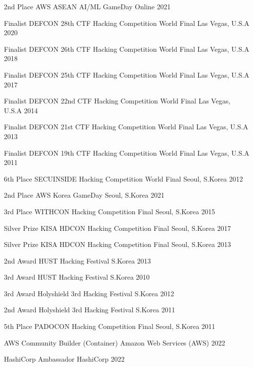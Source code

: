 
{%
\renewcommand{\acvSectionContentTopSkip}{2.5mm}%
\renewcommand{\arraystretch}{1.00}%

\begin{cvhonors}
  \cvhonor
    {2nd Place}
    {AWS ASEAN AI/ML GameDay}
    {Online}
    {2021}

  \cvhonor
    {Finalist}
    {DEFCON 28th CTF Hacking Competition World Final}
    {Las Vegas, U.S.A}
    {2020}

  \cvhonor
    {Finalist}
    {DEFCON 26th CTF Hacking Competition World Final}
    {Las Vegas, U.S.A}
    {2018}

  \cvhonor
    {Finalist}
    {DEFCON 25th CTF Hacking Competition World Final}
    {Las Vegas, U.S.A}
    {2017}

  \cvhonor
    {Finalist}
    {DEFCON 22nd CTF Hacking Competition World Final}
    {Las Vegas, U.S.A}
    {2014}

  \cvhonor
    {Finalist}
    {DEFCON 21st CTF Hacking Competition World Final}
    {Las Vegas, U.S.A}
    {2013}

  \cvhonor
    {Finalist}
    {DEFCON 19th CTF Hacking Competition World Final}
    {Las Vegas, U.S.A}
    {2011}

  \cvhonor
    {6th Place}
    {SECUINSIDE Hacking Competition World Final}
    {Seoul, S.Korea}
    {2012}
\end{cvhonors}


\begin{cvhonors}
  \cvhonor
    {2nd Place}
    {AWS Korea GameDay}
    {Seoul, S.Korea}
    {2021}

  \cvhonor
    {3rd Place}
    {WITHCON Hacking Competition Final}
    {Seoul, S.Korea}
    {2015}

  \cvhonor
    {Silver Prize}
    {KISA HDCON Hacking Competition Final}
    {Seoul, S.Korea}
    {2017}

  \cvhonor
    {Silver Prize}
    {KISA HDCON Hacking Competition Final}
    {Seoul, S.Korea}
    {2013}

  \cvhonor
    {2nd Award}
    {HUST Hacking Festival}
    {S.Korea}
    {2013}

  \cvhonor
    {3rd Award}
    {HUST Hacking Festival}
    {S.Korea}
    {2010}

  \cvhonor
    {3rd Award}
    {Holyshield 3rd Hacking Festival}
    {S.Korea}
    {2012}

  \cvhonor
    {2nd Award}
    {Holyshield 3rd Hacking Festival}
    {S.Korea}
    {2011}

  \cvhonor
    {5th Place}
    {PADOCON Hacking Competition Final}
    {Seoul, S.Korea}
    {2011}
\end{cvhonors}


\begin{cvhonors}
  \cvhonor
    {AWS Community Builder (Container)}
    {Amazon Web Services (AWS)}
    {}
    {2022}

  \cvhonor
    {HashiCorp Ambassador}
    {HashiCorp}
    {}
    {2022}
\end{cvhonors}
}
